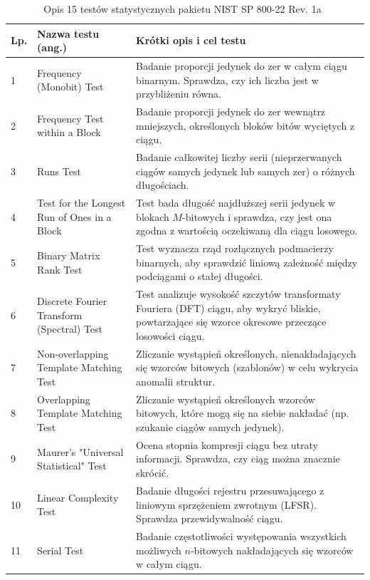 \begin{table}[htbp]
\centering
\caption{Opis 15 testów statystycznych pakietu NIST SP 800-22 Rev. 1a~\cite{NIST-SP-800-22}}
\label{tab:nist_tests}
\vspace{2mm}
\footnotesize %
\begin{tabularx}{\textwidth}{lX p{9.5cm}}
\toprule
\textbf{Lp.} & \textbf{Nazwa testu (ang.)} & \textbf{Krótki opis i cel testu} \\
\midrule
1 & Frequency (Monobit) Test & Badanie proporcji jedynek do zer w całym ciągu binarnym. Sprawdza, czy ich liczba jest w przybliżeniu równa. \\
2 & Frequency Test within a Block & Badanie proporcji jedynek do zer wewnątrz mniejszych, określonych bloków bitów wyciętych z ciągu. \\
3 & Runs Test & Badanie całkowitej liczby serii (nieprzerwanych ciągów samych jedynek lub samych zer) o różnych długościach. \\
4 & Test for the Longest Run of Ones in a Block & Test bada długość najdłuższej serii jedynek w blokach $M$-bitowych i sprawdza, czy jest ona zgodna z wartością oczekiwaną dla ciągu losowego. \\
5 & Binary Matrix Rank Test & Test wyznacza rząd rozłącznych podmacierzy binarnych, aby sprawdzić liniową zależność między podciągami o stałej długości. \\
6 & Discrete Fourier Transform (Spectral) Test & Test analizuje wysokość szczytów transformaty Fouriera (DFT) ciągu, aby wykryć bliskie, powtarzające się wzorce okresowe przeczące losowości ciągu. \\
7 & Non-overlapping Template Matching Test & Zliczanie wystąpień określonych, nienakładających się wzorców bitowych (szablonów) w celu wykrycia anomalii struktur. \\
8 & Overlapping Template Matching Test & Zliczanie wystąpień określonych wzorców bitowych, które mogą się na siebie nakładać (np. szukanie ciągów samych jedynek). \\
9 & Maurer's "Universal Statistical" Test & Ocena stopnia kompresji ciągu bez utraty informacji. Sprawdza, czy ciąg można znacznie skrócić. \\
10 & Linear Complexity Test & Badanie długości rejestru przesuwającego z liniowym sprzężeniem zwrotnym (LFSR). Sprawdza przewidywalność ciągu. \\
11 & Serial Test & Badanie częstotliwości występowania wszystkich możliwych $n$-bitowych nakładających się wzorców w całym ciągu. \\

\end{tabularx}
\end{table}
